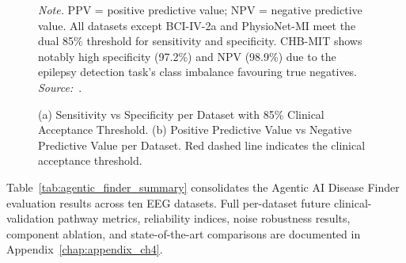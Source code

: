 \begin{figure}[!htbp]
{%
}
\caption[Sensitivity, Specificity, PPV, and NPV Analysis]{(a) Sensitivity vs Specificity per Dataset with 85\% Clinical Acceptance Threshold. (b) Positive Predictive Value vs Negative Predictive Value per Dataset. Red dashed line indicates the clinical acceptance threshold.}
\vspace{0.5em}\noindent\textit{Note.} PPV = positive predictive value; NPV = negative predictive value. All datasets except BCI-IV-2a and PhysioNet-MI meet the dual 85\% threshold for sensitivity and specificity. CHB-MIT shows notably high specificity (97.2\%) and NPV (98.9\%) due to the epilepsy detection task's class imbalance favouring true negatives. \textit{Source:}~\cite{asthana2025eegmaster}.
\end{figure}
\fi %

\fi %

Table~\ref{tab:agentic_finder_summary} consolidates the Agentic AI Disease Finder evaluation results across ten EEG datasets. Full per-dataset future clinical-validation pathway metrics, reliability indices, noise robustness results, component ablation, and state-of-the-art comparisons are documented in Appendix~\ref{chap:appendix_ch4}.

